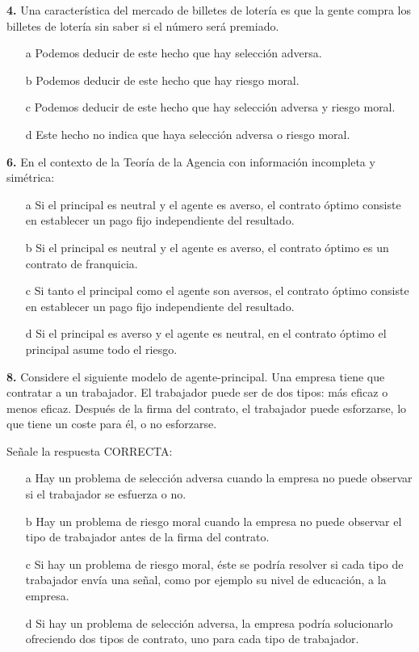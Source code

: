 \documentclass{nuevotema}
\begin{document}

\textbf{4.} Una característica del mercado de billetes de lotería es que la gente compra los billetes de lotería sin saber si el número será premiado.

\begin{itemize}
	\item[a] Podemos deducir de este hecho que hay selección adversa.
	\item[b] Podemos deducir de este hecho que hay riesgo moral.
	\item[c] Podemos deducir de este hecho que hay selección adversa y riesgo moral.
	\item[d] Este hecho no indica que haya selección adversa o riesgo moral.
\end{itemize}


\textbf{6.} En el contexto de la Teoría de la Agencia con información incompleta y simétrica:

\begin{itemize}
	\item[a] Si el principal es neutral y el agente es averso, el contrato óptimo consiste en establecer un pago fijo independiente del resultado.
	\item[b] Si el principal es neutral y el agente es averso, el contrato óptimo es un contrato de franquicia.
	\item[c] Si tanto el principal como el agente son aversos, el contrato óptimo consiste en establecer un pago fijo independiente del resultado.
	\item[d] Si el principal es averso y el agente es neutral, en el contrato óptimo el principal asume todo el riesgo.
\end{itemize}


\textbf{8.} Considere el siguiente modelo de agente-principal. Una empresa tiene que contratar a un trabajador. El trabajador puede ser de dos tipos: más eficaz o menos eficaz. Después de la firma del contrato, el trabajador puede esforzarse, lo que tiene un coste para él, o no esforzarse.

Señale la respuesta CORRECTA:

\begin{itemize}
	\item[a] Hay un problema de selección adversa cuando la empresa no puede observar si el trabajador se esfuerza o no.
	\item[b] Hay un problema de riesgo moral cuando la empresa no puede observar el tipo de trabajador antes de la firma del contrato.
	\item[c] Si hay un problema de riesgo moral, éste se podría resolver si cada tipo de trabajador envía una señal, como por ejemplo su nivel de educación, a la empresa.
	\item[d] Si hay un problema de selección adversa, la empresa podría solucionarlo ofreciendo dos tipos de contrato, uno para cada tipo de trabajador.
\end{itemize}
\end{document}
